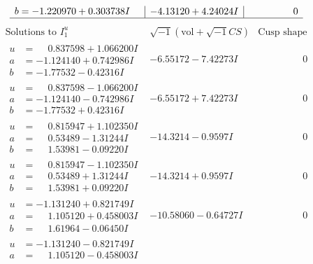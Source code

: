 \documentclass[1p]{elsarticle_modified}
\theoremstyle{definition}
\newcommand{\I}{\sqrt{-1}}
\begin{document}
$$\begin{array}{c|c|c}
\begin{aligned}
b &= -1.220970 + 0.303738 I\end{aligned}
 & -4.13120 + 4.24024 I & \phantom{-0.000000 } 0\\
 \hline 
 \end{array}$$\newpage$$\begin{array}{c|c|c}  
\text{Solutions to }I^u_{1}& \I (\text{vol} + \sqrt{-1}CS) & \text{Cusp shape}\\
 \hline 
\begin{aligned}
u &= \phantom{-}0.837598 + 1.066200 I \\
a &= -1.124140 + 0.742986 I \\
b &= -1.77532 - 0.42316 I\end{aligned}
 & -6.55172 - 7.42273 I & \phantom{-0.000000 } 0 \\ \hline\begin{aligned}
u &= \phantom{-}0.837598 - 1.066200 I \\
a &= -1.124140 - 0.742986 I \\
b &= -1.77532 + 0.42316 I\end{aligned}
 & -6.55172 + 7.42273 I & \phantom{-0.000000 } 0 \\ \hline\begin{aligned}
u &= \phantom{-}0.815947 + 1.102350 I \\
a &= \phantom{-}0.53489 - 1.31244 I \\
b &= \phantom{-}1.53981 - 0.09220 I\end{aligned}
 & -14.3214 - 0.9597 I & \phantom{-0.000000 } 0 \\ \hline\begin{aligned}
u &= \phantom{-}0.815947 - 1.102350 I \\
a &= \phantom{-}0.53489 + 1.31244 I \\
b &= \phantom{-}1.53981 + 0.09220 I\end{aligned}
 & -14.3214 + 0.9597 I & \phantom{-0.000000 } 0 \\ \hline\begin{aligned}
u &= -1.131240 + 0.821749 I \\
a &= \phantom{-}1.105120 + 0.458003 I \\
b &= \phantom{-}1.61964 - 0.06450 I\end{aligned}
 & -10.58060 - 0.64727 I & \phantom{-0.000000 } 0 \\ \hline\begin{aligned}
u &= -1.131240 - 0.821749 I \\
a &= \phantom{-}1.105120 - 0.458003 I \\

\end{aligned}
\end{array}$$
\end{document}
